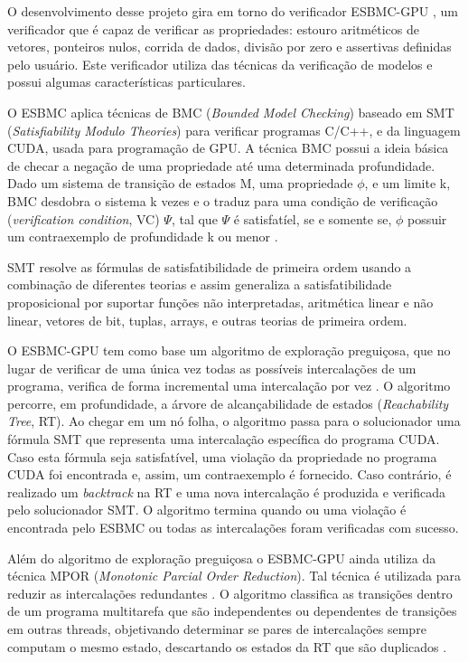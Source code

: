 O desenvolvimento desse projeto gira em torno do verificador ESBMC-GPU \cite{monteiro2018}, um verificador que é capaz de verificar as propriedades: estouro aritméticos de vetores, ponteiros nulos, corrida de dados, divisão por zero e assertivas definidas pelo usuário. Este verificador utiliza das técnicas da verificação de modelos e possui algumas características particulares.  


O ESBMC aplica técnicas de BMC (\textit{Bounded Model Checking}) baseado em SMT (\textit{Satisfiability Modulo Theories}) para verificar programas C/C++, e da linguagem CUDA, usada para programação de GPU. A técnica BMC possui a ideia básica de checar a negação de uma propriedade até uma determinada profundidade. Dado um sistema de transição de estados M, uma propriedade $\phi$, e um limite k, BMC desdobra o sistema k vezes e o traduz para uma condição de verificação (\textit{verification condition}, VC) $\Psi$, tal que $\Psi$ é satisfatíel, se e somente se, $\phi$ possuir um contraexemplo de profundidade k ou menor \cite{cordeiro2012}.


SMT resolve as fórmulas de satisfatibilidade de primeira ordem usando a combinação de diferentes teorias e assim generaliza a satisfatibilidade proposicional por suportar funções não interpretadas, aritmética linear e não linear, vetores de bit, tuplas, arrays, e outras teorias de primeira ordem.


O ESBMC-GPU tem como base um algoritmo de exploração preguiçosa, que no lugar de verificar de uma única vez todas as possíveis intercalações de um programa, verifica de forma incremental uma intercalação por vez \cite{cordeiro2011}. O algoritmo percorre, em profundidade, a árvore de alcançabilidade de estados (\textit{Reachability Tree}, RT). Ao chegar em um nó folha, o algoritmo passa para o solucionador uma fórmula SMT que representa uma intercalação específica do programa CUDA. Caso esta fórmula seja satisfatível, uma violação da propriedade no programa CUDA foi encontrada e, assim, um contraexemplo é fornecido. Caso contrário, é realizado um \textit{backtrack} na RT e uma nova intercalação é produzida e verificada pelo solucionador SMT. O algoritmo termina quando ou uma violação é encontrada pelo ESBMC ou todas as intercalações foram verificadas com sucesso.


Além do algoritmo de exploração preguiçosa o ESBMC-GPU ainda utiliza da técnica MPOR (\textit{Monotonic Parcial Order Reduction}). Tal técnica é utilizada para reduzir as intercalações redundantes \cite{kahlon2009}. O algoritmo classifica as transições dentro de um programa multitarefa que são independentes ou dependentes de transições em outras threads, objetivando determinar se pares de intercalações sempre computam o mesmo estado, descartando os estados da RT que são duplicados \cite{morse2015}.



